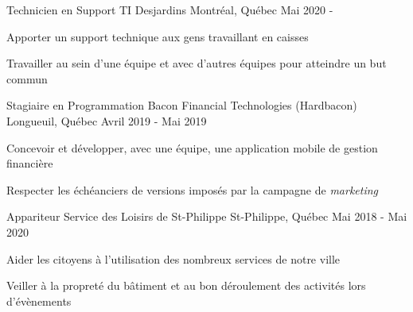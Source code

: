 

\begin{cventries}

  \cventry
    {Technicien en Support TI} %
    {Desjardins} %
    {Montréal, Québec} %
    {Mai 2020 - } %
    {
      \begin{cvitems} %
        \item {Apporter un support technique aux gens travaillant en caisses}
        \item {Travailler au sein d'une équipe et avec d'autres équipes pour atteindre un but commun}
      \end{cvitems}
    }
    
  \cventry
    {Stagiaire en Programmation} %
    {Bacon Financial Technologies (Hardbacon)} %
    {Longueuil, Québec} %
    {Avril 2019 - Mai 2019} %
    {
      \begin{cvitems} %
        \item {Concevoir et développer, avec une équipe, une application mobile de gestion financière}
        \item {Respecter les échéanciers de versions imposés par la campagne de \textit{marketing}}
      \end{cvitems}
    }
    
  \cventry
    {Appariteur} %
    {Service des Loisirs de St-Philippe} %
    {St-Philippe, Québec} %
    {Mai 2018 - Mai 2020} %
    {
      \begin{cvitems} %
        \item {Aider les citoyens à l'utilisation des nombreux services de notre ville}
        \item {Veiller à la propreté du bâtiment et au bon déroulement des activités lors d'évènements}
      \end{cvitems}
    }

\end{cventries}
